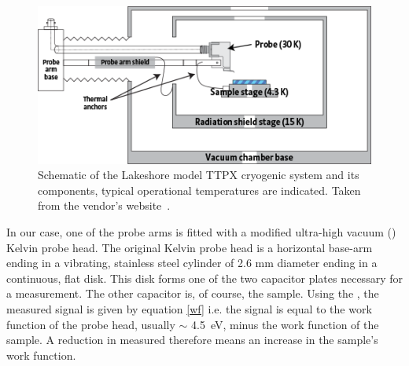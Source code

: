 \begin{figure}
\centering
	\includegraphics[width=0.8\linewidth]{./figs/chap2/Config_TTPX}
	\caption[Schematic of the Lakeshore model TTPX cryogenic system and its components, typical operational temperatures are indicated.]{Schematic of the Lakeshore model TTPX cryogenic system and its components, typical operational temperatures are indicated. Taken from the vendor's website~\cite{lakeshore}.}
	\label{fig:McAscheme}
\end{figure}
In our case, one of the probe arms is fitted with a modified \McA{} ultra-high vacuum (\uhv{}) Kelvin probe head. The original \McA{} \uhv{} Kelvin probe head is a horizontal base-arm ending in a vibrating, stainless steel cylinder of 2.6 mm diameter ending in a continuous, flat disk. This disk forms one of the two capacitor plates necessary for a \cpd{} measurement. The other capacitor is, of course, the sample. Using the \McA{}, the measured signal is given by equation \eqref{wf} i.e. the signal is equal to the work function of the probe head, usually $\sim$ \SI{4.5}{\electronvolt}, minus the work function of the sample. A reduction in measured \cpd{} therefore means an increase in the sample's work function.\\
